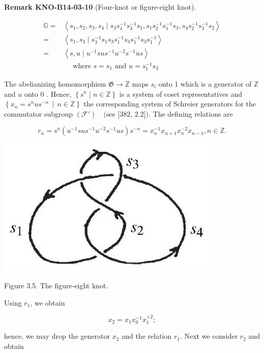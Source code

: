 \documentclass[10pt, letterpaper]{article}
\newcommand{\CustomHeading}[3]{%
  \par\medskip\noindent%
  \textbf{#1 #2} \textnormal{(#3)}.\enskip%
}
\newenvironment{REM}[2]{\begin{unitbox}\CustomHeading{Remark}{#1}{#2}}{\end{unitbox}}
\begin{document}
\begin{REM}{KNO-B14-03-10}{Four-knot or figure-eight knot}
$$
\begin{aligned}
\mathbb{G}= & \left\langle s_{1}, s_{2}, s_{3}, s_{4} \mid s_{3} s_{4}^{-1} s_{3}^{-1} s_{1}, s_{1} s_{2}^{-1} s_{1}^{-1} s_{3}, s_{4} s_{2}^{-1} s_{3}^{-1} s_{2}\right\rangle \\
= & \left\langle s_{1}, s_{3} \mid s_{3}^{-1} s_{1} s_{3} s_{1}^{-1} s_{3} s_{1}^{-1} s_{3} s_{1}^{-1}\right\rangle \\
= & \left\langle s, u \mid u^{-1} s u s^{-1} u^{-2} s^{-1} u s\right\rangle \\
& \quad \text { where } s=s_{1} \text { and } u=s_{1}^{-1} s_{3}
\end{aligned}
$$

The abelianizing homomorphism $\mathfrak{G} \rightarrow \mathbb{Z}$ maps $s_{i}$ onto 1 which is a generator of $\mathbb{Z}$ and $u$ onto 0 . Hence, $\left\{s^{n} \mid n \in \mathbb{Z}\right\}$ is a system of coset representatives and $\left\{ x_n = s^n u s^{-n} \,\middle|\, n \in \mathbb{Z} \right\}$ the corresponding system of Schreier generators for the commutator subgroup $\left(\mathscr{F}'\right) \quad \text{(see [382, 2.2])}$. The defining relations are

$$
r_{n}=s^{n}\left(u^{-1} s u s^{-1} u^{-2} s^{-1} u s\right) s^{-n}=x_{n}^{-1} x_{n+1} x_{n}^{-2} x_{n-1}, n \in \mathbb{Z} .
$$

\begin{center}
\includegraphics[scale=0.2]{2025_05_21_9c06be8de7a55410f8c1g-050}
\end{center}

Figure 3.5. The figure-eight knot.

Using $r_{1}$, we obtain

$$
x_{2}=x_{1} x_{0}^{-1} x_{1}^{+2} ;
$$

hence, we may drop the generator $x_{2}$ and the relation $r_{1}$. Next we consider $r_{2}$ and obtain


\end{REM}
\end{document}
